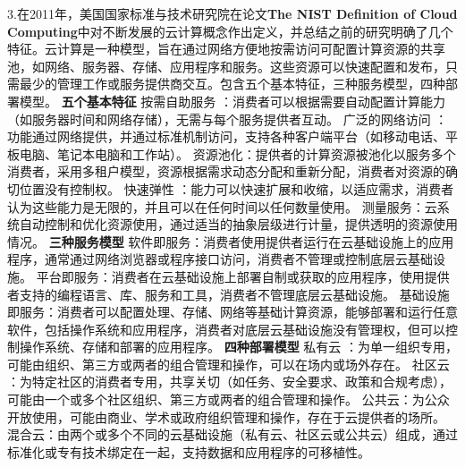 \documentclass[a4paper,twoside]{scrbook}
\begin{document}
3.在2011年，美国国家标准与技术研究院在论文\textbf{The NIST Definition of Cloud  Computing}中对不断发展的云计算概念作出定义，并总结之前的研究明确了几个特征。云计算是一种模型，旨在通过网络方便地按需访问可配置计算资源的共享池，如网络、服务器、存储、应用程序和服务。这些资源可以快速配置和发布，只需最少的管理工作或服务提供商交互。包含五个基本特征，三种服务模型，四种部署模型。
\textbf{五个基本特征}
按需自助服务 ：消费者可以根据需要自动配置计算能力（如服务器时间和网络存储），无需与每个服务提供者互动。
广泛的网络访问 ：功能通过网络提供，并通过标准机制访问，支持各种客户端平台（如移动电话、平板电脑、笔记本电脑和工作站）。
资源池化：提供者的计算资源被池化以服务多个消费者，采用多租户模型，资源根据需求动态分配和重新分配，消费者对资源的确切位置没有控制权。
快速弹性 ：能力可以快速扩展和收缩，以适应需求，消费者认为这些能力是无限的，并且可以在任何时间以任何数量使用。
测量服务：云系统自动控制和优化资源使用，通过适当的抽象层级进行计量，提供透明的资源使用情况。
\textbf{三种服务模型}
软件即服务：消费者使用提供者运行在云基础设施上的应用程序，通常通过网络浏览器或程序接口访问，消费者不管理或控制底层云基础设施。
平台即服务：消费者在云基础设施上部署自制或获取的应用程序，使用提供者支持的编程语言、库、服务和工具，消费者不管理底层云基础设施。
基础设施即服务：消费者可以配置处理、存储、网络等基础计算资源，能够部署和运行任意软件，包括操作系统和应用程序，消费者对底层云基础设施没有管理权，但可以控制操作系统、存储和部署的应用程序。
\textbf{四种部署模型}
私有云 ：为单一组织专用，可能由组织、第三方或两者的组合管理和操作，可以在场内或场外存在。
社区云 ：为特定社区的消费者专用，共享关切（如任务、安全要求、政策和合规考虑），可能由一个或多个社区组织、第三方或两者的组合管理和操作。
公共云：为公众开放使用，可能由商业、学术或政府组织管理和操作，存在于云提供者的场所。
混合云：由两个或多个不同的云基础设施（私有云、社区云或公共云）组成，通过标准化或专有技术绑定在一起，支持数据和应用程序的可移植性。
\end{document}
